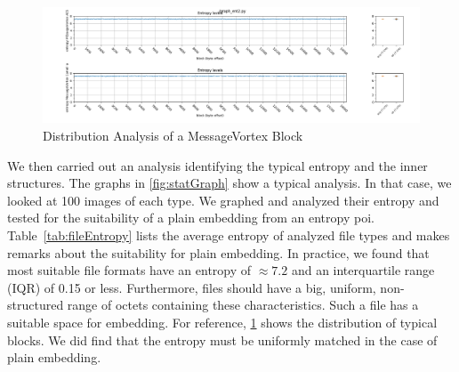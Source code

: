 \begin{figure}[ht]
	\includegraphics[width=\textwidth]{inc/statanalysis_mv}
	\caption{Distribution Analysis of a MessageVortex Block}
	\label{fig:statMvGraph}
\end{figure}

We then carried out an analysis identifying the typical entropy and the inner structures. The graphs in \cref{fig:statGraph} show a typical analysis. In that case, we looked at 100 images of each type. We graphed and analyzed their entropy and tested for the suitability of a plain embedding from an entropy poi. Table~\ref{tab:fileEntropy} lists the average entropy of analyzed file types and makes remarks about the suitability for plain embedding. In practice, we found that most suitable file formats have an entropy of $\approx 7.2$ and an interquartile range (IQR) of 0.15 or less. Furthermore, files should have a big, uniform, non-structured range of octets containing these characteristics. Such a file has a suitable space for embedding. For reference, \cref{fig:statMvGraph} shows the distribution of typical \MessageVortex{} blocks. We did find that the entropy must be uniformly matched in the case of plain embedding.

